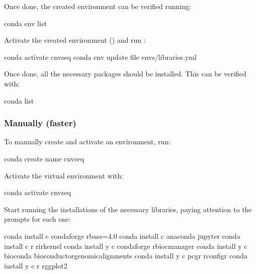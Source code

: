 \documentclass[letterpaper,10pt,english]{sphinxhowto}
\begin{document}
Once done, the created environment can be verified running:

\begin{sphinxVerbatim}[commandchars=\\\{\}]
\PYGZdl{} conda env list
\end{sphinxVerbatim}

Activate the created environment () and run :

\begin{sphinxVerbatim}[commandchars=\\\{\}]
\PYGZdl{} conda activate cnv\PYGZhy{}seq
\PYGZdl{} conda env update \PYGZhy{}\PYGZhy{}file envs/libraries.yml
\end{sphinxVerbatim}

Once done, all the necessary packages should be installed. This can be verified with:

\begin{sphinxVerbatim}[commandchars=\\\{\}]
\PYGZdl{} conda list
\end{sphinxVerbatim}


\subsubsection{Manually (faster)}
\label{\detokenize{index:manually-faster}}
To manually create and activate an environment, run:

\begin{sphinxVerbatim}[commandchars=\\\{\}]
\PYGZdl{} conda create \PYGZhy{}\PYGZhy{}name cnv\PYGZhy{}seq
\end{sphinxVerbatim}

Activate the virtual environment with:

\begin{sphinxVerbatim}[commandchars=\\\{\}]
\PYGZdl{} conda activate cnv\PYGZhy{}seq
\end{sphinxVerbatim}

Start running the installations of the necessary libraries, paying attention to the prompts for each one:

\begin{sphinxVerbatim}[commandchars=\\\{\}]
\PYGZdl{} conda install \PYGZhy{}c conda\PYGZhy{}forge r\PYGZhy{}base=4.0
\PYGZdl{} conda install \PYGZhy{}c anaconda jupyter
\PYGZdl{} conda install \PYGZhy{}c r r\PYGZhy{}irkernel
\PYGZdl{} conda install \PYGZhy{}y \PYGZhy{}c conda\PYGZhy{}forge r\PYGZhy{}biocmanager
\PYGZdl{} conda install \PYGZhy{}y \PYGZhy{}c bioconda bioconductor\PYGZhy{}genomicalignments
\PYGZdl{} conda install \PYGZhy{}y \PYGZhy{}c pcgr r\PYGZhy{}configr
\PYGZdl{} conda install \PYGZhy{}y \PYGZhy{}c r r\PYGZhy{}ggplot2
\end{sphinxVerbatim}
\end{document}
